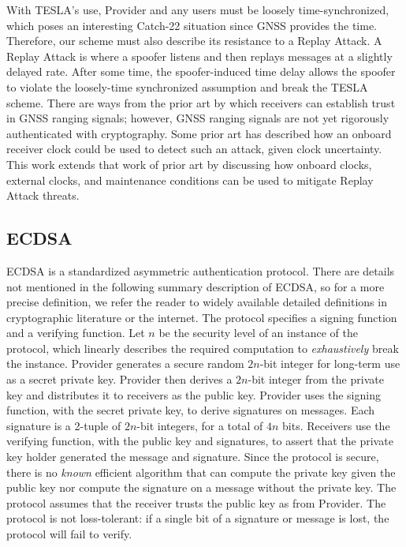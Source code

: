 \documentclass[letterpaper,times]{IONconf/IONconf}
\begin{document}
	With TESLA's use, Provider and any users must be loosely time-synchronized, which poses an interesting Catch-22 situation since GNSS provides the time.
	Therefore, our scheme must also describe its resistance to a Replay Attack.
	A Replay Attack is where a spoofer listens and then replays messages at a slightly delayed rate.
	After some time, the spoofer-induced time delay allows the spoofer to violate the loosely-time synchronized assumption and break the TESLA scheme.
	There are ways from the prior art by which receivers can establish trust in GNSS ranging signals\cite{Psiaki2016,Fernandez-Hernandez2018}; however, GNSS ranging signals are not yet rigorously authenticated with cryptography.
	Some prior art has described how an onboard receiver clock could be used to detect such an attack, given clock uncertainty\cite{time_sync_paper}.
	This work extends that work of prior art by discussing how onboard clocks, external clocks, and maintenance conditions can be used to mitigate Replay Attack threats.

	\subsection{ECDSA} \label{sub:ecdsa}

		ECDSA is a standardized asymmetric authentication protocol.
		There are details not mentioned in the following summary description of ECDSA, so for a more precise definition, we refer the reader to widely available detailed definitions in cryptographic literature or the internet.
		The protocol specifies a signing function and a verifying function.
		Let $n$ be the security level of an instance of the protocol, which linearly describes the required computation to {\em exhaustively} break the instance.
		Provider generates a secure random $2n$-bit integer for long-term use as a secret private key.
		Provider then derives a $2n$-bit integer from the private key and distributes it to receivers as the public key.
		Provider uses the signing function, with the secret private key, to derive signatures on messages.
		Each signature is a 2-tuple of $2n$-bit integers, for a total of $4n$ bits.
		Receivers use the verifying function, with the public key and signatures, to assert that the private key holder generated the message and signature.
		Since the protocol is secure, there is no {\em known} efficient algorithm that can compute the private key given the public key nor compute the signature on a message without the private key.
		The protocol assumes that the receiver trusts the public key as from Provider.
		The protocol is not loss-tolerant: if a single bit of a signature or message is lost, the protocol will fail to verify.
\end{document}
